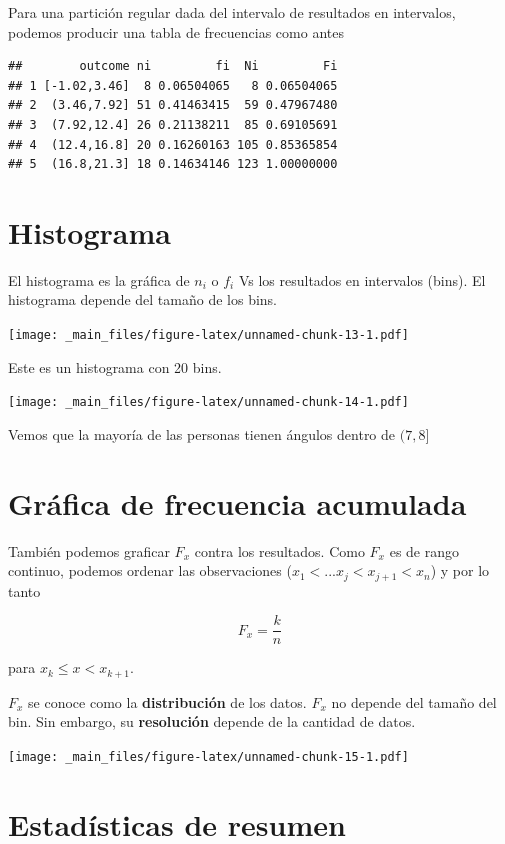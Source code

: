 \documentclass[
]{book}
\begin{document}
Para una partición regular dada del intervalo de resultados en intervalos, podemos producir una tabla de frecuencias como antes

\begin{verbatim}
##        outcome ni         fi  Ni         Fi
## 1 [-1.02,3.46]  8 0.06504065   8 0.06504065
## 2  (3.46,7.92] 51 0.41463415  59 0.47967480
## 3  (7.92,12.4] 26 0.21138211  85 0.69105691
## 4  (12.4,16.8] 20 0.16260163 105 0.85365854
## 5  (16.8,21.3] 18 0.14634146 123 1.00000000
\end{verbatim}

\hypertarget{histograma}{%
\section{Histograma}\label{histograma}}

El histograma es la gráfica de \(n_i\) o \(f_i\) Vs los resultados en intervalos (bins). El histograma depende del tamaño de los bins.

\texttt{[image: \_main\_files/figure-latex/unnamed-chunk-13-1.pdf]}

Este es un histograma con 20 bins.

\texttt{[image: \_main\_files/figure-latex/unnamed-chunk-14-1.pdf]}

Vemos que la mayoría de las personas tienen ángulos dentro de \((7, 8]\)

\hypertarget{gruxe1fica-de-frecuencia-acumulada-1}{%
\section{Gráfica de frecuencia acumulada}\label{gruxe1fica-de-frecuencia-acumulada-1}}

También podemos graficar \(F_x\) contra los resultados. Como \(F_x\) es de rango continuo, podemos ordenar las observaciones (\(x_1 <... x_j < x_{j+1} < x_n\)) y por lo tanto

\[F_x = \frac{k}{n}\]

para \(x_{k} \leq x < x_{k+1}\).

\(F_x\) se conoce como la \textbf{distribución} de los datos. \(F_x\) no depende del tamaño del bin. Sin embargo, su \textbf{resolución} depende de la cantidad de datos.

\texttt{[image: \_main\_files/figure-latex/unnamed-chunk-15-1.pdf]}

\hypertarget{estaduxedsticas-de-resumen}{%
\section{Estadísticas de resumen}\label{estaduxedsticas-de-resumen}}
\end{document}
